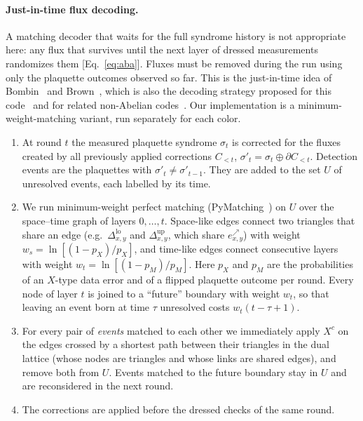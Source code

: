 \documentclass[a4paper]{article}
\newcommand{\ed}[1]{e^{\nearrow}_{#1}}      %
\newcommand{\tlo}[1]{\Delta^{\mathrm{lo}}_{#1}}
\newcommand{\tup}[1]{\Delta^{\mathrm{up}}_{#1}}
\begin{document}
\paragraph{Just-in-time flux decoding.}
A matching decoder that waits for the full syndrome history is not appropriate here: any flux that survives until the next layer of dressed measurements randomizes them [Eq.~\eqref{eq:aba}]. Fluxes must be removed during the run using only the plaquette outcomes observed so far. This is the just-in-time idea of Bombin~\cite{bombin2018jit} and Brown~\cite{brown2020jit}, which is also the decoding strategy proposed for this code~\cite{kobayashi2025clifford} and for related non-Abelian codes~\cite{davydova2025knots,magdalena2026}. Our implementation is a minimum-weight-matching variant, run separately for each color.
\begin{enumerate}[leftmargin=*,itemsep=0pt]
\item At round $t$ the measured plaquette syndrome $\sigma_t$ is corrected for the fluxes created by all previously applied corrections $C_{<t}$, $\sigma'_t=\sigma_t\oplus\partial C_{<t}$. Detection events are the plaquettes with $\sigma'_t\neq\sigma'_{t-1}$. They are added to the set $U$ of unresolved events, each labelled by its time.
\item We run minimum-weight perfect matching (PyMatching~\cite{higgott2025pymatching}) on $U$ over the space--time graph of layers $0,\dots,t$. Space-like edges connect two triangles that share an edge (e.g.\ $\tlo{x,y}$ and $\tup{x,y}$, which share $\ed{x,y}$) with weight $w_s=\ln[(1-p_X)/p_X]$, and time-like edges connect consecutive layers with weight $w_t=\ln[(1-p_M)/p_M]$. Here $p_X$ and $p_M$ are the probabilities of an $X$-type data error and of a flipped plaquette outcome per round. Every node of layer $t$ is joined to a ``future'' boundary with weight $w_t$, so that leaving an event born at time $\tau$ unresolved costs $w_t(t-\tau+1)$.
\item For every pair of \emph{events} matched to each other we immediately apply $X^c$ on the edges crossed by a shortest path between their triangles in the dual lattice (whose nodes are triangles and whose links are shared edges), and remove both from $U$. Events matched to the future boundary stay in $U$ and are reconsidered in the next round.
\item The corrections are applied before the dressed checks of the same round.
\end{enumerate}
\end{document}
